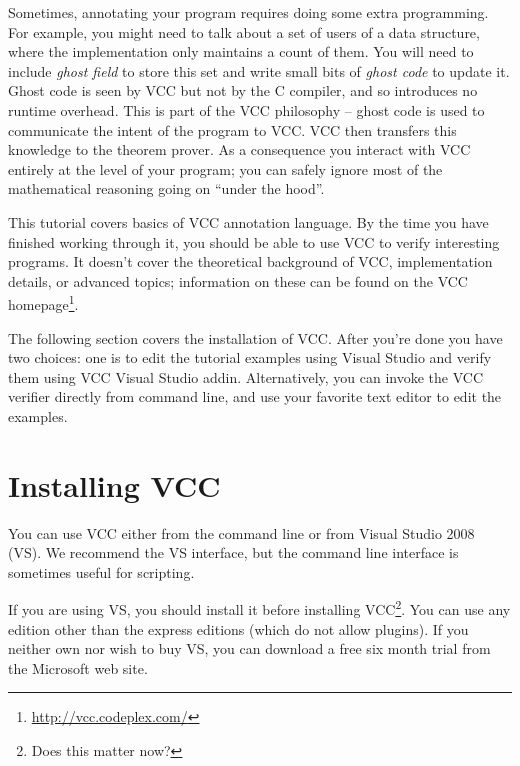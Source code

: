 Sometimes, annotating your program requires doing some extra
programming. 
For example, you might need to talk about a set of users of a 
data structure, where the implementation only maintains a count of them.
You will need to include \emph{ghost field} to store this set
and write small bits of \emph{ghost code} to update it.
Ghost code is seen by VCC but not by the C
compiler, and so introduces no runtime overhead.
This is part of the VCC philosophy -- ghost code is used to communicate
the intent of the program to VCC.
VCC then transfers this knowledge to the theorem prover.
As a consequence you interact with VCC
entirely at the level of your program; you can safely ignore most of
the mathematical reasoning going on ``under the hood''.


This tutorial covers basics of VCC annotation language. By the time
you have finished working through it, you should be able to use VCC to
verify interesting programs. 
It doesn't cover the theoretical
background of VCC, implementation details, or advanced topics;
information on these can be found on the VCC homepage\footnote{\url{http://vcc.codeplex.com/}}.


The following section covers the installation of VCC.
After you're done you have two choices: one is to edit the tutorial examples
using Visual Studio and verify them using VCC Visual Studio addin.
Alternatively, you can invoke the VCC verifier directly from command line,
and use your favorite text editor to edit the examples.

\section{Installing VCC} 
You can use VCC either from the command line or from Visual Studio
2008 (VS).  We recommend the VS interface, but the command line interface
is sometimes useful for scripting.

If you are using VS, you should install it before
installing VCC\footnote{Does this matter now?}. You can use any
edition other than the express editions (which do not allow
plugins). If you neither own nor wish to buy VS, you can download a
free six month trial from the Microsoft web site.

